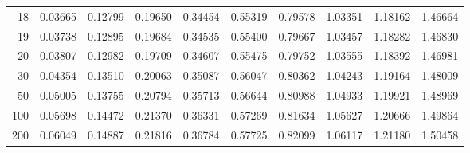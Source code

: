 \begin{minipage}{18cm}
\begin{tabular}{|r|rrr|rrr|rrr|}
18&0.03665&0.12799&0.19650&0.34454&0.55319&0.79578&1.03351&1.18162&1.46664\\
\rowcolor[gray]{.9}
19&0.03738&0.12895&0.19684&0.34535&0.55400&0.79667&1.03457&1.18282&1.46830\\
20&0.03807&0.12982&0.19709&0.34607&0.55475&0.79752&1.03555&1.18392&1.46981\\
\rowcolor[gray]{.9}
30&0.04354&0.13510&0.20063&0.35087&0.56047&0.80362&1.04243&1.19164&1.48009\\
50&0.05005&0.13755&0.20794&0.35713&0.56644&0.80988&1.04933&1.19921&1.48969\\
\rowcolor[gray]{.9}
100&0.05698&0.14472&0.21370&0.36331&0.57269&0.81634&1.05627&1.20666&1.49864\\
200&0.06049&0.14887&0.21816&0.36784&0.57725&0.82099&1.06117&1.21180&1.50458\\

\hline
\end{tabular}

    \end{minipage}
\newpage

